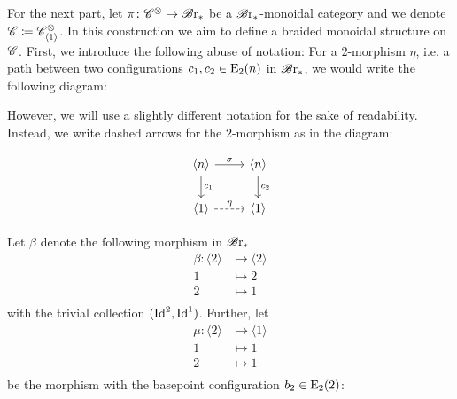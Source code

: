 \begin{const}\label{con:brx_monoidal} For the next part, let $\pi \colon
\mathscr{C}^{\otimes} \to \mathscr{B} \text{r}_{\ast}$ be a $\mathscr{B} \text{r}_{\ast}$-monoidal category and we denote $\mathscr{C} \coloneqq
\mathscr{C}^{\otimes}_{\langle 1 \rangle}$. In this construction we aim to define a braided
monoidal structure on $\mathscr{C}$. First, we introduce the following abuse of notation:
For a $2$-morphism $\eta$, i.e. a path between two configurations $c_1, c_2 \in
\operatorname{E}_2(n)$ in $\mathscr{B} \text{r}_{\ast}$, we would write the following diagram:
\begin{center}
\end{center}

However, we will use a slightly different notation for the sake of readability.
Instead, we write dashed arrows for the $2$-morphism as in the diagram:

\[    
    \begin{tikzcd}
        \langle n \rangle \arrow[r, "\sigma"] \arrow[d, "c_1"] & \langle n \rangle \arrow[d, "c_2"] \\
        \langle 1 \rangle  \arrow[r, dashed, "\eta"]                  & \langle 1 \rangle                
    \end{tikzcd}
\]


Let $\beta$ denote the following morphism in $\mathscr{B} \text{r}_{\ast}$
     \begin{align*}
         \beta \colon \langle 2 \rangle &\to \langle 2 \rangle \\
         1 &\mapsto 2 \\
         2 &\mapsto 1 \\
     \end{align*}
with the trivial collection $(\operatorname{Id}^2, \operatorname{Id}^1)$. Further, let 
\begin{align*}
    \mu \colon \langle 2 \rangle &\to \langle 1 \rangle \\
    1 &\mapsto 1 \\
    2 &\mapsto 1 \\
\end{align*}
be the morphism with the basepoint configuration $b_2 \in \operatorname{E}_2(2)$:
\begin{center}
\end{center}
\end{const}
